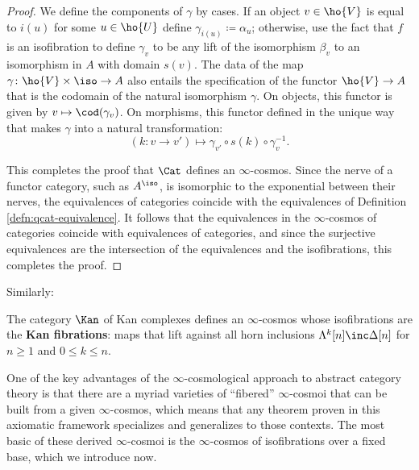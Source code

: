 \begin{proof}
We define the components of $\gamma$ by cases. If an object $v \in \ho{V}$ is equal to $i(u)$ for some $u \in \ho{U}$ define $\gamma_{i(u)} \coloneq \alpha_u$; otherwise, use the fact that $f$ is an isofibration to define $\gamma_v$ to be any lift of the isomorphism $\beta_v$ to an isomorphism in $A$ with domain $s(v)$. The data of the map $\gamma \colon \ho{V} \times \iso \to A$ also entails the specification of the functor $\ho{V} \to A$ that is the codomain of the natural isomorphism $\gamma$. On objects, this functor is given by $v \mapsto \cod(\gamma_v)$. On morphisms, this functor defined in the unique way that makes $\gamma$ into a natural transformation:
\[ (k \colon v \to v') \mapsto  \gamma_{v'} \circ s(k) \circ \gamma_v^{-1}.\]

This completes the proof that $\Cat$ defines an $\infty$-cosmos. Since the nerve of a functor category, such as $A^\iso$, is isomorphic to the exponential between their nerves, the equivalences of categories coincide with the equivalences of Definition \ref{defn:qcat-equivalence}. It follows that the equivalences in the $\infty$-cosmos of categories coincide with equivalences of categories, and since the surjective equivalences are the intersection of the equivalences and the isofibrations, this completes the proof.
\end{proof}

Similarly:

\begin{proposition}\label{prop:kan-cosmos}
   The category $\Kan$ of Kan complexes defines an $\infty$-cosmos whose isofibrations are the \textbf{Kan fibrations}: maps that lift against all horn inclusions $\Lambda^k[n] \inc \Delta[n]$ for $n \geq 1$ and $0 \leq k \leq n$.
\end{proposition}

One of the key advantages of the $\infty$-cosmological approach to abstract category theory is that there are a myriad varieties of ``fibered'' $\infty$-cosmoi that can be built from a given $\infty$-cosmos, which means that any theorem proven in this axiomatic framework specializes and generalizes to those contexts. The most basic of these derived $\infty$-cosmoi is the $\infty$-cosmos of isofibrations over a fixed base, which we introduce now. %

